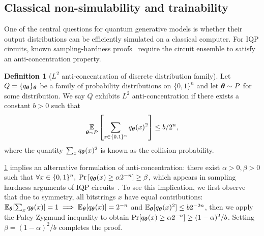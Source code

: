 \documentclass{article}
\theoremstyle{plain}
\theoremstyle{definition}
\newtheorem{definition}[theorem]{Definition}
\theoremstyle{remark}
\begin{document}
\subsection{Classical non-simulability and trainability}\label{subsec:non-simulability}
One of the central questions for quantum generative models is whether their output distributions can be efficiently simulated on a classical computer. For IQP circuits, known sampling-hardness proofs~\cite{Bremner17} require the circuit ensemble to satisfy an anti-concentration property.
\begin{definition}[$L^2$ anti-concentration of discrete distribution family]
\label{def:anti-concentration}
Let $Q = \{q_{\bm{\theta}}\}_{\bm{\theta}}$ be a family of probability distributions on $\{0,1\}^n$ and let ${\bm{\theta}} \sim P$ for some distribution. We say $Q$ exhibits $L^2$ anti-concentration if there exists a constant $b>0$ such that
\begin{equation}
    \operatorname*{\mathbb{E}}_{{\bm{\theta}} \sim P}\left[\sum_{x\in\{0,1\}^n} q_{\bm{\theta}}(x)^2\right] \leq b/2^n,
\end{equation}
where the quantity $\sum_x q_{\bm{\theta}}(x)^2$ is known as the collision probability.  
\end{definition}
\cref{def:anti-concentration} implies an alternative formulation of anti-concentration: there exist $\alpha>0,\beta>0$ such that $\forall x\in \{0,1\}^n, \;\Pr\left[q_{\bm{\theta}}(x)\geq \alpha 2^{-n}\right]\ge \beta$,
which appears in sampling hardness arguments of IQP circuits~\cite{Bremner16, Bremner17}. To see this implication, we first observe that due to symmetry, all bitstrings $x$ have equal contributions: $\mathbb{E}_{\bm{\theta}}[\sum_xq_{\bm{\theta}}(x)] = 1\implies \mathbb{E}_{\bm{\theta}}[q_{\bm{\theta}}(x)] = 2^{-n}$ and $\mathbb{E}_{\bm{\theta}}[q_{\bm{\theta}}(x)^2] \le b2^{-2n}$, then we apply the Paley-Zygmund inequality to obtain $\Pr[q_{\bm{\theta}}(x) \ge \alpha2^{-n}] \ge (1-\alpha)^2/b$. Setting $\beta = (1-\alpha)^2/b$ completes the proof.
\end{document}
